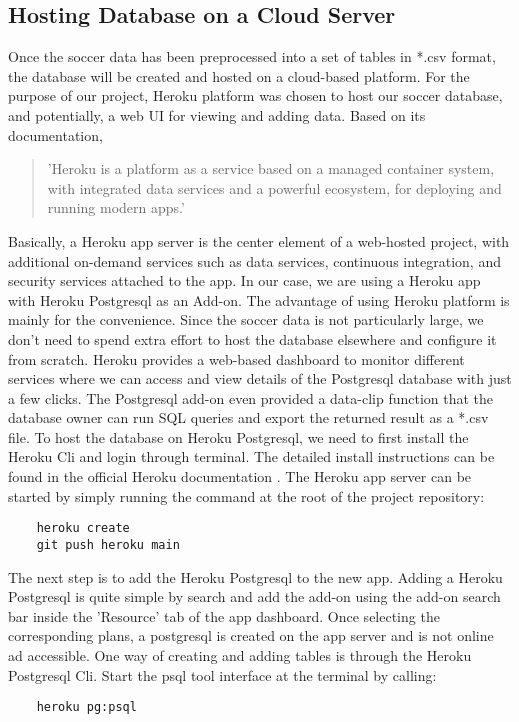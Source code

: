 \subsection{Hosting Database on a Cloud Server}
Once the soccer data has been preprocessed into a set of tables in *.csv format, the database will be created and hosted on a cloud-based platform. For the purpose of our project, Heroku platform was chosen to host our soccer database, and potentially, a web UI for viewing and adding data.
Based on its documentation, \begin{quote}
    'Heroku is a platform as a service based on a managed container system, with integrated data services and a powerful ecosystem, for deploying and running modern apps.' \cite{b10}
\end{quote} Basically, a Heroku app server is the center element of a web-hosted project, with additional on-demand services such as data services, continuous integration, and security services attached to the app. In our case, we are using a Heroku app with Heroku Postgresql as an Add-on. The advantage of using Heroku platform is mainly for the convenience. Since the soccer data is not particularly large, we don't need to spend extra effort to host the database elsewhere and configure it from scratch. Heroku provides a web-based dashboard to monitor different services where we can access and view details of the Postgresql database with just a few clicks. The Postgresql add-on even provided a data-clip function that the database owner can run SQL queries and export the returned result as a *.csv file.
To host the database on Heroku Postgresql, we need to first install the Heroku Cli and login through terminal. The detailed install instructions can be found in the official Heroku documentation \cite{b11}. The Heroku app server can be started by simply running the command at the root of the project repository: 
\begin{verbatim}
    heroku create
    git push heroku main
\end{verbatim}
The next step is to add the Heroku Postgresql to the new app. Adding a Heroku Postgresql is quite simple by search and add the add-on using the add-on search bar inside the 'Resource' tab of the app dashboard. Once selecting the corresponding plans, a postgresql is created on the app server and is not online ad accessible. One way of creating and adding tables is through the Heroku Postgresql Cli. Start the psql tool interface at the terminal by calling: \begin{verbatim}
    heroku pg:psql
\end{verbatim} 
